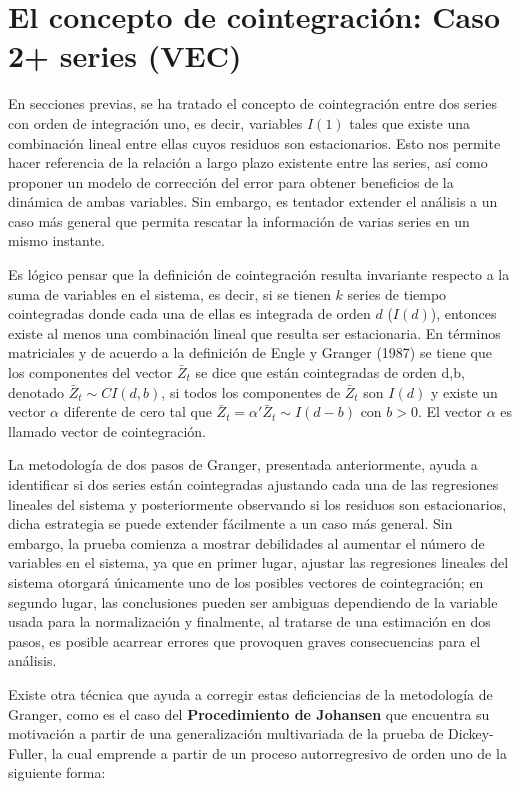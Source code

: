 

\section{El concepto de cointegración: Caso 2+ series (VEC)}

En secciones previas, se ha tratado el concepto de cointegración entre dos series  con orden de integración uno, es decir, variables $I(1)$ tales que existe una combinación lineal entre ellas cuyos residuos son estacionarios. Esto nos permite hacer referencia de la relación a largo plazo  existente entre las series, así como proponer un modelo de corrección del error para obtener beneficios de la dinámica de ambas variables. Sin embargo, es tentador  extender el análisis a un caso más general que permita rescatar la información de varias series en un mismo instante. \bigskip 

Es lógico pensar que la definición de cointegración resulta invariante respecto a la suma de variables en el sistema, es decir, si se tienen $k$ series de tiempo cointegradas donde cada una de ellas es integrada de orden $d$ ($I(d)$), entonces existe al menos una combinación lineal que resulta ser estacionaria. En términos matriciales y de acuerdo a la definición de Engle y Granger (1987) se tiene que los componentes del vector $\bar{Z}_t$ se dice que están cointegradas de orden d,b, denotado $\bar{Z}_t \sim CI(d,b)$, si todos los componentes de $\bar{Z}_t$ son $I(d)$ y existe un vector $\alpha$ diferente de cero tal que $\bar{Z}_t = \alpha'\bar{Z}_t \sim I(d-b)$ con $b>0$. El vector $\alpha$ es llamado vector de cointegración. \bigskip 


La metodología de dos pasos de Granger, presentada anteriormente, ayuda a identificar si dos series están cointegradas ajustando cada una de las regresiones lineales del sistema y posteriormente observando si los residuos son estacionarios, dicha estrategia se puede extender fácilmente a un caso más general. Sin embargo, la prueba comienza a mostrar debilidades al aumentar el número de variables en el sistema, ya que en primer lugar, ajustar las regresiones lineales del sistema otorgará únicamente uno de los posibles vectores de cointegración; en segundo lugar, las conclusiones pueden ser ambiguas dependiendo de la variable usada para la normalización y finalmente, al tratarse de una estimación en dos pasos, es posible acarrear errores que provoquen graves consecuencias para el análisis.\bigskip 

Existe otra técnica que ayuda a corregir estas deficiencias de la metodología de Granger, como es el caso del \textbf{Procedimiento de Johansen} que encuentra su motivación a partir de una generalización multivariada de la prueba de Dickey-Fuller, la cual emprende a partir de un proceso autorregresivo de orden uno de la siguiente forma:

